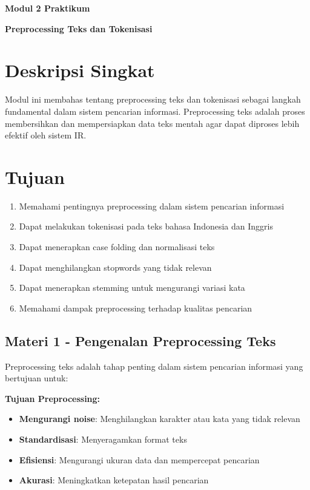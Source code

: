 
\begin{center}
    \textbf{Modul 2 Praktikum \matakuliah}

    \textbf{Preprocessing Teks dan Tokenisasi}
\end{center}

\section*{Deskripsi Singkat}
Modul ini membahas tentang preprocessing teks dan tokenisasi sebagai langkah fundamental dalam sistem pencarian informasi. Preprocessing teks adalah proses membersihkan dan mempersiapkan data teks mentah agar dapat diproses lebih efektif oleh sistem IR.

\section*{Tujuan}
\begin{enumerate}
    \item Memahami pentingnya preprocessing dalam sistem pencarian informasi
    \item Dapat melakukan tokenisasi pada teks bahasa Indonesia dan Inggris
    \item Dapat menerapkan case folding dan normalisasi teks
    \item Dapat menghilangkan stopwords yang tidak relevan
    \item Dapat menerapkan stemming untuk mengurangi variasi kata
    \item Memahami dampak preprocessing terhadap kualitas pencarian
\end{enumerate}

\subsection*{Materi 1 - Pengenalan Preprocessing Teks}

Preprocessing teks adalah tahap penting dalam sistem pencarian informasi yang bertujuan untuk:

\textbf{Tujuan Preprocessing:}
\begin{itemize}
    \item \textbf{Mengurangi noise}: Menghilangkan karakter atau kata yang tidak relevan
    \item \textbf{Standardisasi}: Menyeragamkan format teks
    \item \textbf{Efisiensi}: Mengurangi ukuran data dan mempercepat pencarian
    \item \textbf{Akurasi}: Meningkatkan ketepatan hasil pencarian
\end{itemize}

